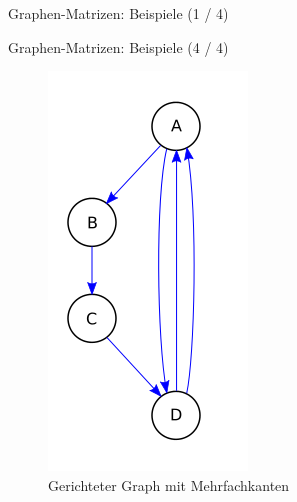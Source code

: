 \documentclass[aspectratio=169]{beamer}
\begin{document}
\begin{frame}{Graphen-Matrizen: Beispiele (1 / 4)}
\begin{multicols*}{2}
    \end{multicols*}

\end{frame}

\begin{frame}{Graphen-Matrizen: Beispiele (4 / 4)}

    \begin{multicols*}{2}
        
        \begin{figure}[H]
            \centering
            \includegraphics[height = 0.6 \textheight]{Graph_gerichtet_Mehrfachkanten.svg.png}
            \caption{Gerichteter Graph mit Mehrfachkanten}
        \end{figure}


\end{multicols*}
\end{frame}
\end{document}
